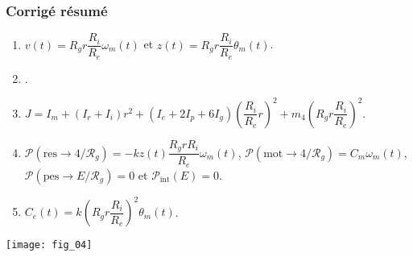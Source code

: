 \begin{multicols}{2}
\ifprof
\else
\ifcolle
\else
\subsubsection*{Corrigé résumé}
\begin{enumerate}
\item $v(t)=R_g r \dfrac{R_i}{R_e}\omega_m(t)$ et $z(t)=R_g r \dfrac{R_i}{R_e}\theta_m(t)$. 
\item .
\item $J=I_m+\left(I_r+I_i\right)r^2 +\left(I_e+2I_p+6I_g\right)\left( \dfrac{R_i}{R_e}r\right)^2 +m_4\left( R_g r \dfrac{R_i}{R_e} \right)^2$.

\item $\mathcal{P}\left(\text{res}\to 4/\mathcal{R}_g \right)=-kz(t) \dfrac{R_g rR_i}{R_e}\omega_m(t)$, $\mathcal{P}\left(\text{mot}\to 4/\mathcal{R}_g \right)=C_m\omega_m(t)$, $\mathcal{P}\left(\text{pes}\to E/\mathcal{R}_g \right)=0$ et
$\mathcal{P}_{\text{int}}\left(E\right)=0$.
\item $C_e(t) = k \left(R_g r \dfrac{R_i}{R_e}\right)^2\theta_m(t)$.
\end{enumerate}
\fi
\fi

\ifprof
\else
\end{multicols}
\fi

%

\ifprof
\else
\begin{center}
\texttt{[image: fig\_04]}
\end{center}
\fi


